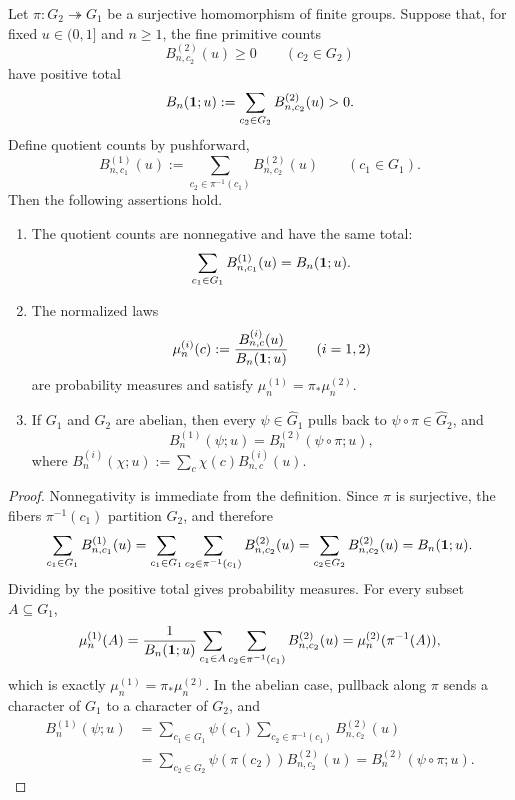 \begin{lemma}\label{lem:chebotarev-quotient-pushforward-compatibility}
Let \(\pi:G_2\twoheadrightarrow G_1\) be a surjective homomorphism of finite groups. Suppose that, for fixed \(u\in(0,1]\) and \(n\ge1\), the fine primitive counts
\[
B^{(2)}_{n,c_2}(u)\ge0\qquad(c_2\in G_2)
\]
have positive total
\[
B_n(\mathbf{1};u):=\sum_{c_2\in G_2}B^{(2)}_{n,c_2}(u)>0.
\]
Define quotient counts by pushforward,
\[
B^{(1)}_{n,c_1}(u):=
\sum_{c_2\in\pi^{-1}(c_1)}B^{(2)}_{n,c_2}(u)
\qquad(c_1\in G_1).
\]
Then the following assertions hold.
\begin{enumerate}
\normalfont
  \item The quotient counts are nonnegative and have the same total:
  \[
  \sum_{c_1\in G_1}B^{(1)}_{n,c_1}(u)=B_n(\mathbf{1};u).
  \]
  \item The normalized laws
  \[
  \mu_n^{(i)}(c):=\frac{B^{(i)}_{n,c}(u)}{B_n(\mathbf{1};u)}\qquad(i=1,2)
  \]
  are probability measures and satisfy \(\mu_n^{(1)}=\pi_\ast\mu_n^{(2)}\).
  \item If \(G_1\) and \(G_2\) are abelian, then every \(\psi\in\widehat G_1\) pulls back to \(\psi\circ\pi\in\widehat G_2\), and
  \[
  B_n^{(1)}(\psi;u)=B_n^{(2)}(\psi\circ\pi;u),
  \]
  where \(B_n^{(i)}(\chi;u):=\sum_c\chi(c)B^{(i)}_{n,c}(u)\).
\end{enumerate}
\end{lemma}

\begin{proof}
Nonnegativity is immediate from the definition. Since \(\pi\) is surjective, the fibers \(\pi^{-1}(c_1)\) partition \(G_2\), and therefore
\[
\sum_{c_1\in G_1}B^{(1)}_{n,c_1}(u)
=
\sum_{c_1\in G_1}\sum_{c_2\in\pi^{-1}(c_1)}B^{(2)}_{n,c_2}(u)
=
\sum_{c_2\in G_2}B^{(2)}_{n,c_2}(u)
=B_n(\mathbf{1};u).
\]
Dividing by the positive total gives probability measures. For every subset \(A\subseteq G_1\),
\[
\mu_n^{(1)}(A)
=
\frac{1}{B_n(\mathbf{1};u)}\sum_{c_1\in A}\sum_{c_2\in\pi^{-1}(c_1)}B^{(2)}_{n,c_2}(u)
=
\mu_n^{(2)}(\pi^{-1}(A)),
\]
which is exactly \(\mu_n^{(1)}=\pi_\ast\mu_n^{(2)}\). In the abelian case, pullback along \(\pi\) sends a character of \(G_1\) to a character of \(G_2\), and
\[
\begin{aligned}
B_n^{(1)}(\psi;u)
&=
\sum_{c_1\in G_1}\psi(c_1)\sum_{c_2\in\pi^{-1}(c_1)}B^{(2)}_{n,c_2}(u)\\
&=
\sum_{c_2\in G_2}\psi(\pi(c_2))B^{(2)}_{n,c_2}(u)
=B_n^{(2)}(\psi\circ\pi;u).
\end{aligned}
\]
\end{proof}

